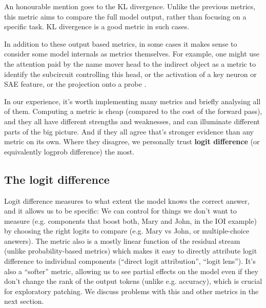 \documentclass[nonatbib]{article}
\begin{document}
An honourable mention goes to the KL divergence. Unlike the previous metrics, this metric aims to compare the full model output, rather than focusing on a specific task. KL divergence is a good metric in such cases.

In addition to these output based metrics, in some cases it makes sense to consider some model internals as metrics themselves. For example, one might use the attention paid by the name mover head to the indirect object as a metric to identify the subcircuit controlling this head, or the activation of a key neuron or SAE feature, or the projection onto a probe \citep{fact_finding}.

In our experience, it’s worth implementing many metrics and briefly analysing all of them. Computing a metric is cheap (compared to the cost of the forward pass), and they all have different strengths and weaknesses, and can illuminate different parts of the big picture. And if they all agree that’s stronger evidence than any metric on its own. Where they disagree, we personally trust \textbf{logit difference} (or equivalently logprob difference) the most.

\subsection{The logit difference}
Logit difference measures to what extent the model knows the correct answer, and it allows us to be specific: We can control for things we don’t want to measure (e.g. components that boost both, Mary and John, in the IOI example) by choosing the right logits to compare (e.g. Mary vs John, or multiple-choice answers). The metric also is a mostly linear function of the residual stream (unlike probability-based metrics) which makes it easy to directly attribute logit difference to individual components (“direct logit attribution”, “logit lens”). It’s also a “softer” metric, allowing us to see partial effects on the model even if they don’t change the rank of the output tokens (unlike e.g. accuracy), which is crucial for exploratory patching. We discuss problems with this and other metrics in the next section.
\end{document}
